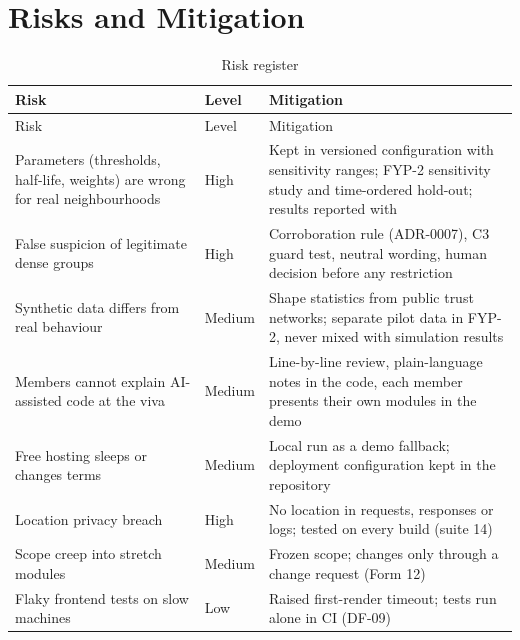 \section{Risks and Mitigation}\label{sec:risks-mitigation}
\begingroup
\begin{longtable}{@{}L{124pt}L{38pt}L{209pt}@{}}
\caption{Risk register}\label{tab:risk-register}\\
\toprule
Risk & Level & Mitigation \\
\midrule
\endfirsthead
\toprule
Risk & Level & Mitigation \\
\midrule
\endhead
\bottomrule
\endlastfoot
Parameters (thresholds, half-life, weights) are wrong for real neighbourhoods & High & Kept in versioned configuration with sensitivity ranges; FYP-2 sensitivity study and time-ordered hold-out; results reported with  \\
False suspicion of legitimate dense groups & High & Corroboration rule (ADR-0007), C3 guard test, neutral wording, human decision before any restriction \\
Synthetic data differs from real behaviour & Medium & Shape statistics from public trust networks; separate pilot data in FYP-2, never mixed with simulation results \\
Members cannot explain AI-assisted code at the viva & Medium & Line-by-line review, plain-language notes in the code, each member presents their own modules in the demo \\
Free hosting sleeps or changes terms & Medium & Local run as a demo fallback; deployment configuration kept in the repository \\
Location privacy breach & High & No location in requests, responses or logs; tested on every build (suite 14) \\
Scope creep into stretch modules & Medium & Frozen scope; changes only through a change request (Form 12) \\
Flaky frontend tests on slow machines & Low & Raised first-render timeout; tests run alone in CI (DF-09) \\
\end{longtable}
\endgroup

